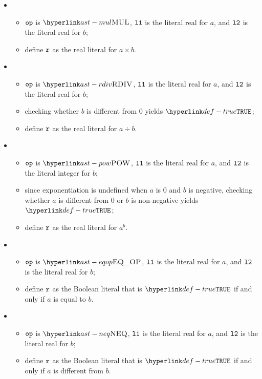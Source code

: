 \begin{itemize}
  \item {}
  \begin{itemize}
    \item $\texttt{op}$ is $\MUL$, $\texttt{l1}$ is the literal real for $a$, and $\texttt{l2}$ is the literal real for $b$;
    \item define $\texttt{r}$ as the real literal for $a \times b$.
  \end{itemize}

  \item {}
  \begin{itemize}
    \item $\texttt{op}$ is $\RDIV$, $\texttt{l1}$ is the literal real for $a$, and $\texttt{l2}$ is the literal real for $b$;
    \item checking whether $b$ is different from $0$ yields $\True$\ProseOrTypeError;
    \item define $\texttt{r}$ as the real literal for $a \div b$.
  \end{itemize}

  \item {}
  \begin{itemize}
    \item $\texttt{op}$ is $\POW$, $\texttt{l1}$ is the literal real for $a$, and $\texttt{l2}$ is the literal integer for $b$;
    \item since exponentiation is undefined when $a$ is 0 and $b$ is negative,
          checking whether $a$ is different from $0$ or $b$ is non-negative yields $\True$\ProseOrTypeError;
    \item define $\texttt{r}$ as the real literal for $a^b$.
  \end{itemize}

  \item {}
  \begin{itemize}
    \item $\texttt{op}$ is $\EQOP$, $\texttt{l1}$ is the literal real for $a$, and $\texttt{l2}$ is the literal real for $b$;
    \item define $\texttt{r}$ as the Boolean literal that is $\True$ if and only if $a$ is equal to $b$.
  \end{itemize}

  \item {}
  \begin{itemize}
    \item $\texttt{op}$ is $\NEQ$, $\texttt{l1}$ is the literal real for $a$, and $\texttt{l2}$ is the literal real for $b$;
    \item define $\texttt{r}$ as the Boolean literal that is $\True$ if and only if $a$ is different from $b$.
  \end{itemize}


\end{itemize}
